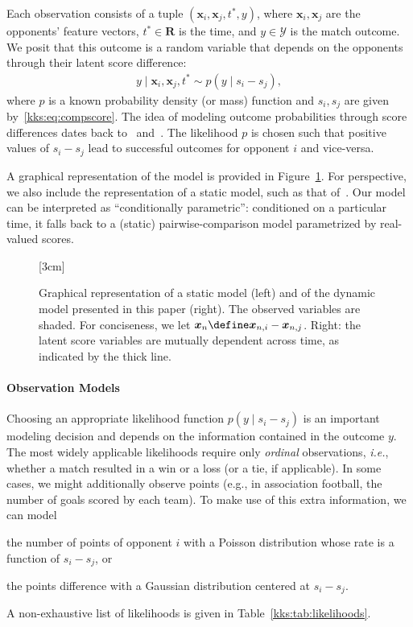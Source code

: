 Each observation consists of a tuple $(\bm{x}_i, \bm{x}_j, t^*, y)$, where $\bm{x}_i, \bm{x}_j$ are the opponents' feature vectors, $t^* \in \mathbf{R}$ is the time, and $y \in \mathcal{Y}$ is the match outcome.
We posit that this outcome is a random variable that depends on the opponents through their latent score difference:
\begin{align*}
	y \mid \bm{x}_i, \bm{x}_j, t^* \sim p( y \mid s_i - s_j ),
\end{align*}
where $p$ is a known probability density (or mass) function and $s_i, s_j$ are given by~\eqref{kks:eq:compscore}.
The idea of modeling outcome probabilities through score differences dates back to~\citet{thurstone1927law} and~\citet{zermelo1928berechnung}.
The likelihood $p$ is chosen such that positive values of $s_i - s_j$ lead to successful outcomes for opponent $i$ and vice-versa.

A graphical representation of the model is provided in Figure~\ref{kks:fig:pgms}.
For perspective, we also include the representation of a static model, such as that of~\citet{thurstone1927law}.
Our model can be interpreted as ``conditionally parametric'': conditioned on a particular time, it falls back to a (static) pairwise-comparison model parametrized by real-valued scores.

\begin{figure}
	\centering
	[3cm]{
		
	}
	\caption{
		Graphical representation of a static model (left) and of the dynamic model presented in this paper (right).
		The observed variables are shaded.
		For conciseness, we let $\bm{x}_n \define \bm{x}_{n,i} - \bm{x}_{n,j}$.
		Right: the latent score variables are mutually dependent across time, as indicated by the thick line.}
	\label{kks:fig:pgms}
\end{figure}

\paragraph{Observation Models}
Choosing an appropriate likelihood function $p(y \mid s_i - s_j)$ is an important modeling decision and depends on the information contained in the outcome $y$.
The most widely applicable likelihoods require only \emph{ordinal} observations, \textit{i.e.}, whether a match resulted in a win or a loss (or a tie, if applicable).
In some cases, we might additionally observe points (e.g., in association football, the number of goals scored by each team).
To make use of this extra information, we can model
\begin{enuminline}
	\item the number of points of opponent $i$ with a Poisson distribution whose rate is a function of $s_i - s_j$, or
	\item the points difference with a Gaussian distribution centered at $s_i - s_j$.
\end{enuminline}
A non-exhaustive list of likelihoods is given in Table~\ref{kks:tab:likelihoods}.

